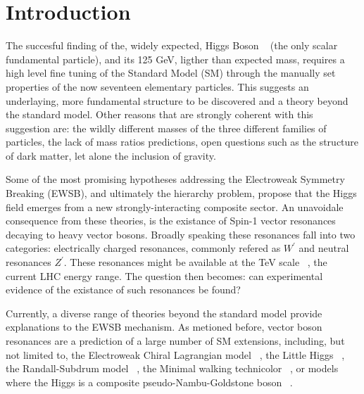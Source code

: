 \section{Introduction}

The succesful finding of the, widely expected, Higgs Boson ~\cite{higgsPaperCMS,higgsPaperATLAS}
(the only scalar fundamental particle), and its 125 GeV, ligther than expected mass,
requires a high level fine tuning of the Standard Model (SM) through the
manually set properties of the now seventeen elementary particles.
This suggests an underlaying, more fundamental structure to be discovered and
a theory beyond the standard model. Other
reasons that are strongly coherent with this suggestion are: the wildly
different masses of the three different families of particles, the lack of
mass ratios predictions, open questions such as the structure of dark matter,
let alone the inclusion of gravity.

Some of the most promising hypotheses addressing the Electroweak Symmetry
Breaking (EWSB), and ultimately the hierarchy problem, propose that the Higgs field
emerges from a new strongly-interacting composite sector. An unavoidale
consequence from these theories, is the existance of Spin-1 vector resonances
decaying to heavy vector bosons.  Broadly speaking these resonances
fall into  two categories: electrically
charged resonances, commonly refered as $W^{\prime}$ and
neutral resonances $Z^{\prime}$. These resonances might be available at the TeV
scale ~\cite{tevscale2014}, the current LHC energy range. The question then becomes:
can experimental evidence of the existance of such resonances be found?

Currently, a diverse range of theories
beyond the standard model provide explanations to the EWSB mechanism. As
metioned before, vector boson resonances are a prediction of a large number
of SM extensions, including, but not limited to, the Electroweak Chiral
Lagrangian model ~\cite{echl2017}, the Little Higgs
~\cite{littlehiggs2007}, the Randall-Subdrum  model ~\cite{randall1999}, the
Minimal walking technicolor ~\cite{technicolor2007}, or models where the Higgs
is a composite pseudo-Nambu-Goldstone boson ~\cite{composite2016}.


